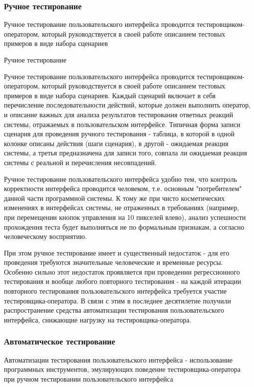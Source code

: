 \documentclass{../industrial-development}
\begin{document}
\begin{frame} \frametitle{Ручное тестирование}
\alert{Ручное тестирование} пользовательского интерфейса проводится тестировщиком-оператором, который руководствуется в своей работе описанием тестовых примеров в виде набора сценариев
\end{frame}

\lecturenotes

Ручное тестирование

Ручное тестирование пользовательского интерфейса проводится тестировщиком-оператором, который руководствуется в своей работе описанием тестовых примеров в виде набора сценариев. Каждый сценарий включает в себя перечисление последовательности действий, которые должен выполнить оператор, и описание важных для анализа результатов тестирования ответных реакций системы, отражаемых в пользовательском интерфейсе. Типичная форма записи сценария для проведения ручного тестирования - таблица, в которой в одной колонке описаны действия (шаги сценария), в другой - ожидаемая реакция системы, а третья предназначена для записи того, совпала ли ожидаемая реакция системы с реальной и перечисления несовпадений.

Ручное тестирование пользовательского интерфейса удобно тем, что контроль корректности интерфейса проводится человеком, т.е. основным "потребителем" данной части программной системы. К тому же при чисто косметических изменениях в интерфейсах системы, не отраженных в требованиях (например, при перемещении кнопок управления на 10 пикселей влево), анализ успешности прохождения теста будет выполняться не по формальным признакам, а согласно человеческому восприятию.

При этом ручное тестирование имеет и существенный недостаток - для его проведения требуются значительные человеческие и временные ресурсы. Особенно сильно этот недостаток проявляется при проведении регрессионного тестирования и вообще любого повторного тестирования - на каждой итерации повторного тестирования пользовательского интерфейса требуется участие тестировщика-оператора. В связи с этим в последнее десятилетие получили распространение средства автоматизации тестирования пользовательского интерфейса, снижающие нагрузку на тестировщика-оператора.

\begin{frame} \frametitle{Автоматическое тестирование}
\alert{Автоматизации тестирования} пользовательского интерфейса - использование программных инструментов, эмулирующих поведение тестировщика-оператора при ручном тестировании пользовательского интерфейса
\end{frame}
\end{document}
